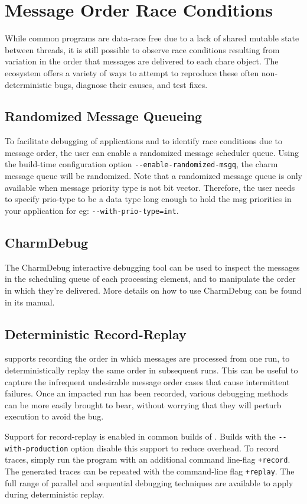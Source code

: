 
\section{Message Order Race Conditions}
While common \charm programs are data-race free due to a lack of
shared mutable state between threads, it is still possible to observe
race conditions resulting from variation in the order that messages
are delivered to each chare object. The \charm ecosystem offers a
variety of ways to attempt to reproduce these often non-deterministic
bugs, diagnose their causes, and test fixes.

\subsection{Randomized Message Queueing}
To facilitate debugging of applications and to identify race
conditions due to message order, the user can enable a randomized
message scheduler queue.  Using the build-time configuration
option \verb|--enable-randomized-msgq|, the charm message queue will
be randomized. Note that a randomized message queue is only available
when message priority type is not bit vector.  Therefore, the user
needs to specify prio-type to be a data type long enough to hold the
msg priorities in your application for
eg: \verb|--with-prio-type=int|.

\subsection{CharmDebug}
The CharmDebug interactive debugging tool can be used to inspect the
messages in the scheduling queue of each processing element, and to
manipulate the order in which they're delivered. More details on how
to use CharmDebug can be found in its manual.

\subsection{Deterministic Record-Replay}
\charm supports recording the order in which messages are processed from one
run, to deterministically replay the same order in subsequent
runs. This can be useful to capture the infrequent undesirable message
order cases that cause intermittent failures. Once an impacted run has
been recorded, various debugging methods can be more easily brought to
bear, without worrying that they will perturb execution to avoid the
bug.

Support for record-replay is enabled in common builds
of \charm. Builds with the \verb|--with-production| option disable
this support to reduce overhead. To record traces, simply run the
program with an additional command line-flag \verb|+record|. The
generated traces can be repeated with the command-line
flag \verb|+replay|. The full range of parallel and sequential
debugging techniques are available to apply during deterministic
replay.


